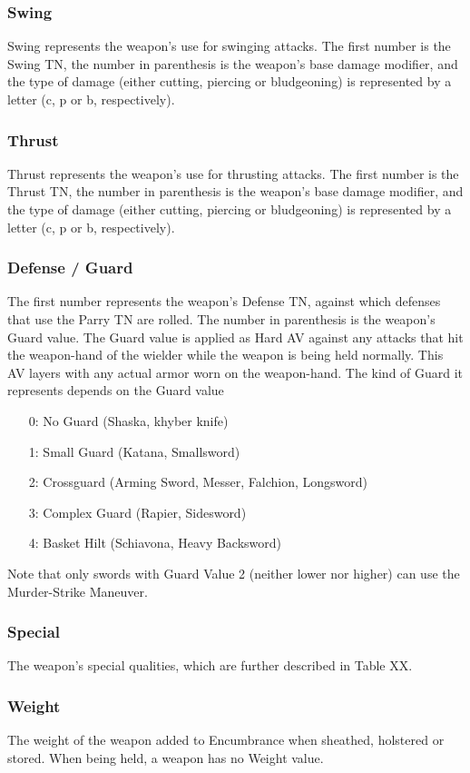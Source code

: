 \documentclass[oneside,11pt,english]{book}
\begin{document}
\subsubsection{Swing}
Swing represents the weapon’s use for swinging attacks. The first number is the Swing TN, the number in parenthesis 
is the weapon’s base damage modifier, and the type of damage (either cutting, piercing or bludgeoning) is represented 
by a letter (c, p or b, respectively). 
\subsubsection{Thrust}
Thrust represents the weapon’s use for thrusting attacks. The first number is the Thrust TN, the number in parenthesis 
is the weapon’s base damage modifier, and the type of damage (either cutting, piercing or bludgeoning) is represented 
by a letter (c, p or b, respectively). 
\subsubsection{Defense / Guard}
The first number represents the weapon’s Defense TN, against which defenses that use the Parry TN are rolled. The 
number in parenthesis is the weapon’s Guard value. The Guard value is applied as Hard AV against any attacks that hit
the weapon-hand of the wielder while the weapon is being held normally. This AV layers with any actual armor worn 
on the weapon-hand. The kind of Guard it represents depends on the Guard value
\begin{itemize}
	\item [0:] No Guard (Shaska, khyber knife)
	\item [1:] Small Guard (Katana, Smallsword)
	\item [2:] Crossguard (Arming Sword, Messer, Falchion, Longsword)
	\item [3:] Complex Guard (Rapier, Sidesword)
	\item [4:] Basket Hilt (Schiavona, Heavy Backsword)
\end{itemize}
Note that only swords with Guard Value 2 (neither lower nor higher) can use the Murder-Strike Maneuver. %
\subsubsection{Special}
The weapon’s special qualities, which are further described in Table XX. 
\subsubsection{Weight}
The weight of the weapon added to Encumbrance when sheathed, holstered or stored. When being held, a weapon has 
no Weight value.
\end{document}
